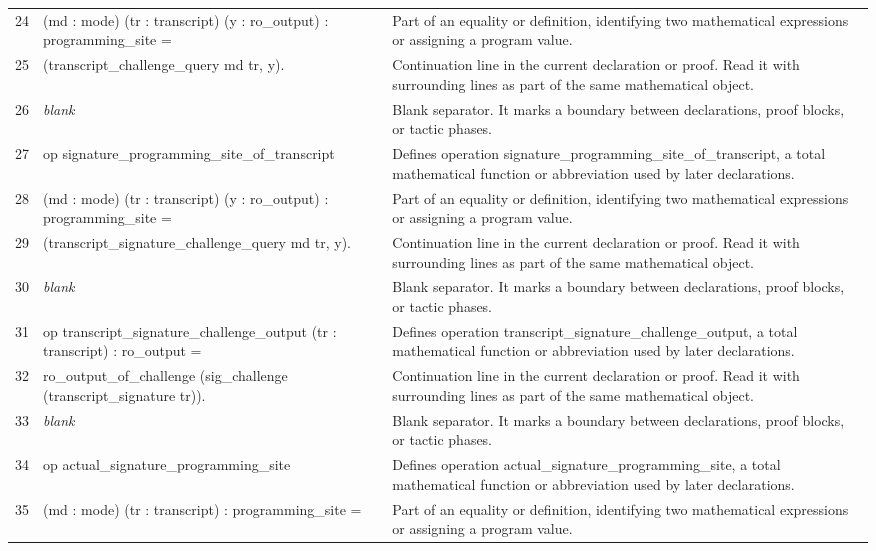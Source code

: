 \documentclass[10pt]{article}
\begin{document}
\begin{longtable}{r L{0.53\textwidth} L{0.37\textwidth}}
24 & {\ttfamily\scriptsize    (md : mode) (tr : transcript) (y : ro\_output) : programming\_site =} & Part of an equality or definition, identifying two mathematical expressions or assigning a program value. \\
25 & {\ttfamily\scriptsize   (transcript\_challenge\_query md tr, y).} & Continuation line in the current declaration or proof.  Read it with surrounding lines as part of the same mathematical object. \\
26 & {\ttfamily\scriptsize \emph{blank}} & Blank separator.  It marks a boundary between declarations, proof blocks, or tactic phases. \\
27 & {\ttfamily\scriptsize op signature\_programming\_site\_of\_transcript} & Defines operation signature\_programming\_site\_of\_transcript, a total mathematical function or abbreviation used by later declarations. \\
28 & {\ttfamily\scriptsize    (md : mode) (tr : transcript) (y : ro\_output) : programming\_site =} & Part of an equality or definition, identifying two mathematical expressions or assigning a program value. \\
29 & {\ttfamily\scriptsize   (transcript\_signature\_challenge\_query md tr, y).} & Continuation line in the current declaration or proof.  Read it with surrounding lines as part of the same mathematical object. \\
30 & {\ttfamily\scriptsize \emph{blank}} & Blank separator.  It marks a boundary between declarations, proof blocks, or tactic phases. \\
31 & {\ttfamily\scriptsize op transcript\_signature\_challenge\_output (tr : transcript) : ro\_output =} & Defines operation transcript\_signature\_challenge\_output, a total mathematical function or abbreviation used by later declarations. \\
32 & {\ttfamily\scriptsize   ro\_output\_of\_challenge (sig\_challenge (transcript\_signature tr)).} & Continuation line in the current declaration or proof.  Read it with surrounding lines as part of the same mathematical object. \\
33 & {\ttfamily\scriptsize \emph{blank}} & Blank separator.  It marks a boundary between declarations, proof blocks, or tactic phases. \\
34 & {\ttfamily\scriptsize op actual\_signature\_programming\_site} & Defines operation actual\_signature\_programming\_site, a total mathematical function or abbreviation used by later declarations. \\
35 & {\ttfamily\scriptsize    (md : mode) (tr : transcript) : programming\_site =} & Part of an equality or definition, identifying two mathematical expressions or assigning a program value. \\

\end{longtable}
\end{document}
